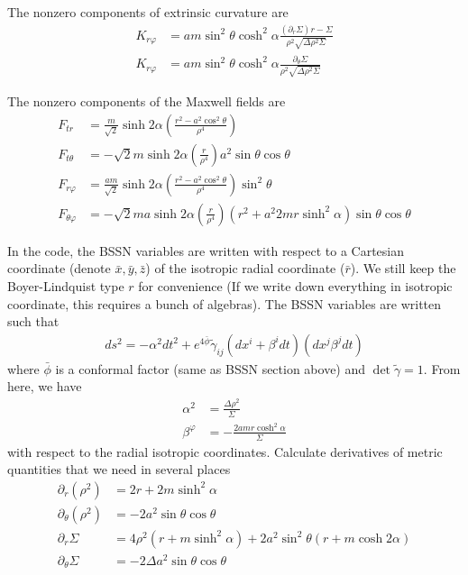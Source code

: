\documentclass[%
 reprint,
 amsmath,amssymb,
 aps,
]{revtex4-1}
\begin{document}
The nonzero components of extrinsic curvature are
\begin{align}
K_{r \varphi} &= a m \sin^2 \theta \cosh^2 \alpha \frac{ (\partial_r \Sigma)r - \Sigma}{\rho^2 \sqrt{\Delta \rho^2 \Sigma}} \\
K_{r \varphi} &= a m \sin^2 \theta \cosh^2 \alpha \frac{ \partial_\theta \Sigma}{\rho^2 \sqrt{\Delta \rho^2 \Sigma}} 
\end{align}

The nonzero components of the Maxwell fields are
\begin{align}
F_{tr} &= \frac{m}{\sqrt{2}} \sinh 2 \alpha \left( \frac{r^2 - a^2 \cos^2 \theta}{\rho^4} \right) \\
F_{t \theta} &= - \sqrt{2} m \sinh 2 \alpha \left(\frac{r}{\rho^4} \right) a^2 \sin \theta \cos \theta \\
F_{r \varphi} &= \frac{a m}{\sqrt{2}} \sinh 2 \alpha \left( \frac{r^2 - a^2 \cos^2 \theta}{\rho^4} \right) \sin^2 \theta \\
F_{\theta \varphi} &= - \sqrt{2} m a \sinh 2 \alpha \left(\frac{r}{\rho^4} \right) (r^2 + a^2 2 m r \sinh^2 \alpha) \sin \theta \cos \theta
\end{align}

In the code, the BSSN variables are written with respect to a Cartesian coordinate (denote $\bar{x}, \bar{y}, \bar{z}$) of the isotropic radial coordinate ($\bar{r}$). We still keep the Boyer-Lindquist type $r$ for convenience (If we write down everything in isotropic coordinate, this requires a bunch of algebras). The BSSN variables are written such that
\begin{align}
ds^2 = -\alpha^2 dt^2 +e^{4\bar{\phi}} \tilde{\gamma}_{ij} (dx^i + \beta^i dt)(dx^j \beta^j dt)
\end{align}
where $\bar{\phi}$ is a conformal factor (same as BSSN section above) and $\det \tilde{\gamma} = 1$. From here, we have
\begin{align}
\alpha^2 &= \frac{\Delta \rho^2}{\Sigma} \\
\beta^{\varphi} &= - \frac{2 a m r \cosh^2 \alpha}{\Sigma}
\end{align}
with respect to the radial isotropic coordinates. Calculate derivatives of metric quantities that we need in several places
\begin{align}
\partial_r (\rho^2) &= 2r + 2m\sinh^2 \alpha\\
\partial_\theta (\rho^2) &= - 2a^2 \sin \theta \cos \theta \\
\partial_r \Sigma &= 4 \rho^2 (r + m \sinh^2 \alpha) + 2a^2 \sin^2 \theta ( r + m \cosh 2 \alpha) \\
\partial_\theta \Sigma &= -2 \Delta a^2 \sin \theta \cos \theta
\end{align}
\end{document}
